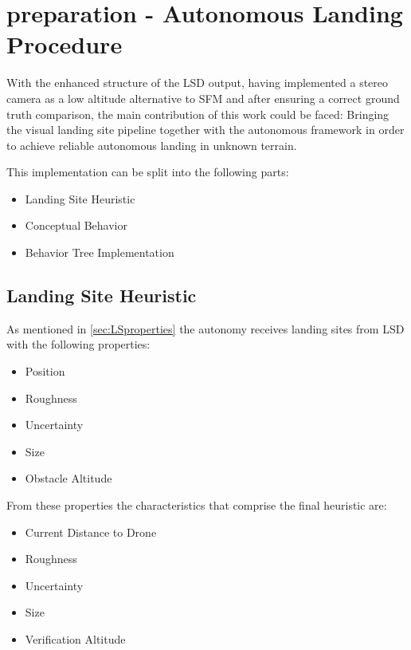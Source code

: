 \chapter{preparation - Autonomous Landing Procedure}\label{chapter:core_implementation}


With the enhanced structure of the LSD output, having implemented a stereo camera as a low altitude alternative to SFM and after ensuring a correct ground truth comparison, the main contribution of this work could be faced: Bringing the visual landing site pipeline together with the autonomous framework in order to achieve reliable autonomous landing in unknown terrain.

This implementation can be split into the following parts:
\begin{itemize}
    \item Landing Site Heuristic
    \item Conceptual Behavior
    \item Behavior Tree Implementation
\end{itemize}



\section{Landing Site Heuristic}\label{subsubsec:LandingSiteHeuristic}

As mentioned in \cref{sec:LSproperties} the autonomy receives landing sites from LSD with the following properties:

\begin{itemize}
    \item Position
    \item Roughness
    \item Uncertainty
    \item Size
    \item Obstacle Altitude
\end{itemize}

From these properties the characteristics that comprise the final heuristic are:

\begin{itemize}
    \item Current Distance to Drone
    \item Roughness
    \item Uncertainty
    \item Size
    \item Verification Altitude
\end{itemize}

